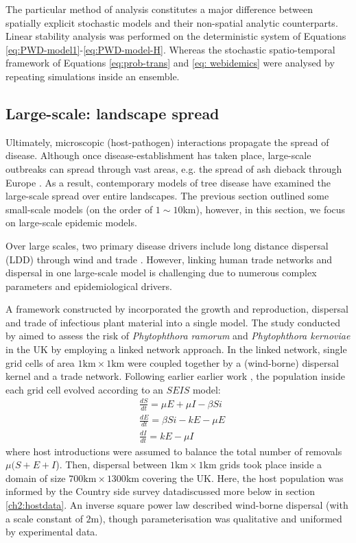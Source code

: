 The particular method of analysis constitutes a major difference between spatially explicit stochastic models 
and their non-spatial analytic counterparts. Linear stability analysis was performed on the deterministic system
of Equations \ref{eq:PWD-model1}-\ref{eq:PWD-model-H}. Whereas the stochastic spatio-temporal framework of Equations
\ref{eq:prob-trans} and \ref{eq: webidemics} were analysed by repeating simulations inside an ensemble.

\subsection{Large-scale: landscape spread}

Ultimately, microscopic (host-pathogen) interactions propagate the spread of disease. 
Although once disease-establishment has taken place, large-scale outbreaks can spread through vast
areas, e.g. the spread of ash dieback through Europe \cite{alsop2015ash}.
As a result, contemporary models of tree disease have examined the large-scale spread over entire landscapes.
The previous section outlined some small-scale models (on the order of $1 \sim 10 \mathrm{km}$), 
however, in this section, we focus on large-scale epidemic models.

Over large scales, two primary disease drivers include long distance dispersal (LDD) through wind \cite{golan2017long, gross2014h} and
trade \cite{ash-dieback-costs, perrings2016options, harwood2009epidemiological, doi:10.1098/rsif.2005.0051}.
However, linking human trade networks and dispersal in one large-scale model is challenging due to numerous complex parameters 
and epidemiological drivers. 

A framework constructed by \cite{harwood2009epidemiological} incorporated the growth and reproduction, dispersal and trade
of infectious plant material into a single model. The study conducted by \cite{harwood2009epidemiological} aimed
to assess the risk of \textit{Phytophthora ramorum} and \textit{Phytophthora kernoviae} in the UK by
employing a linked network approach. 
In the linked network, single grid cells of area $\mathrm{1km \times 1km}$ were coupled together by a (wind-borne)
dispersal kernel and a trade network. 
Following earlier earlier work \cite{madden2007study}, the population inside each grid cell evolved according
to an $SEIS$ model:
\begin{align}
    \label{eq:phyt-model1}
    &\frac{dS}{dt} = \mu E + \mu I - \beta S i\\
    &\frac{dE}{dt} =  \beta S i - k E - \mu E   \\
    \label{eq:phyt-model3}
    &\frac{dI}{dt} = k E - \mu I
\end{align}
where host introductions were assumed to balance the total number of removals $\mu (S + E + I$).
Then, dispersal between $\mathrm{1km \times 1km}$ grids took place inside a domain of size $\mathrm{700km \times 1300km}$ 
covering the UK. Here, the host population was informed by the Country side survey data\textemdash discussed more 
below in section \ref{ch2:hostdata}. An inverse square power law described wind-borne dispersal (with a scale constant
of $2\mathrm{m}$), though parameterisation was qualitative and uniformed by experimental data.

